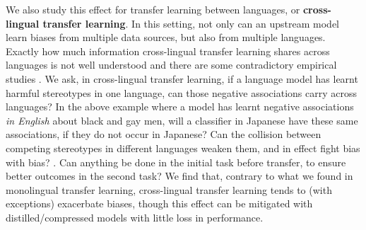 We also study this effect for transfer learning between languages, or \textbf{cross-lingual transfer learning}. In this setting, not only can an upstream model learn biases from multiple data sources, but also from multiple languages. Exactly how much information cross-lingual transfer learning shares across languages is not well understood and there are some contradictory empirical studies \citep{conneau-etal-2020-unsupervised, artetxe-etal-2020-cross}.
We ask, in cross-lingual transfer learning, if a language model has learnt harmful stereotypes in one language, can those negative associations carry across languages? In the above example where a model has learnt negative associations \textit{in English} about black and gay men, will a classifier in Japanese have these same associations, if they do not occur in Japanese? Can the collision between competing stereotypes in different languages weaken them, and in effect fight bias with bias? \citep{stanovsky-etal-2019-evaluating}. Can anything be done in the initial task before transfer, to ensure better outcomes in the second task? We find that, contrary to what we found in monolingual transfer learning, cross-lingual transfer learning tends to (with exceptions) exacerbate biases, though this effect can be mitigated with distilled/compressed models with little loss in performance. 

